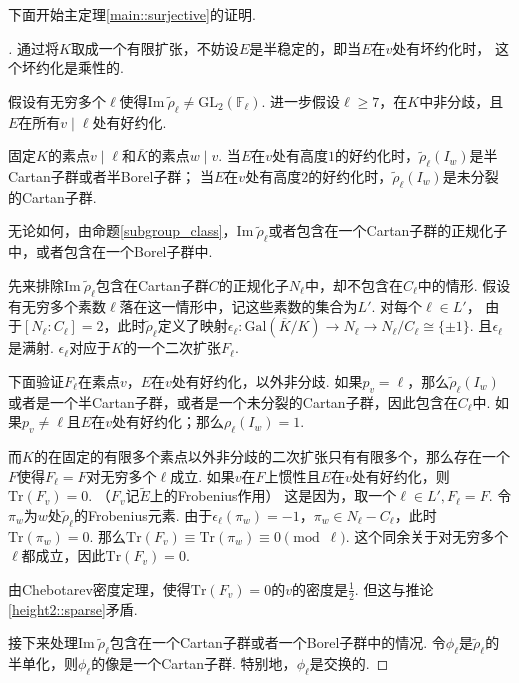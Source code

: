 下面开始主定理\ref{main::surjective}的证明.
\begin{proof}[]
    通过将$K$取成一个有限扩张，不妨设$E$是半稳定的，即当$E$在$v$处有坏约化时，
    这个坏约化是乘性的.

    假设有无穷多个$\ell$使得$\mathrm{Im}\ \tilde{\rho}_{\ell}\neq \mathrm{GL}_2(\mathbb{F}_{\ell})$.
    进一步假设$\ell\geq 7$，在$K$中非分歧，且$E$在所有$v\mid \ell$处有好约化.

    固定$K$的素点$v\mid \ell$和$\overline{K}$的素点$w\mid v$.
    当$E$在$v$处有高度$1$的好约化时，$\tilde{\rho}_{\ell}(I_w)$是半Cartan子群或者半Borel子群；
    当$E$在$v$处有高度$2$的好约化时，$\tilde{\rho}_{\ell}(I_w)$是未分裂的Cartan子群.
    
    无论如何，由命题\ref{subgroup_class}，$\mathrm{Im}\ \tilde{\rho}_{\ell}$或者包含在一个Cartan子群的正规化子中，或者包含在一个Borel子群中.
    \vskip0.3cm

    先来排除$\mathrm{Im}\ \tilde{\rho}_{\ell}$包含在Cartan子群$C$的正规化子$N_{\ell}$中，却不包含在$C_{\ell}$中的情形.
    假设有无穷多个素数$\ell$落在这一情形中，记这些素数的集合为$L'$. 对每个$\ell\in L'$，
    由于$[N_{\ell}:C_{\ell}]=2$，此时$\tilde{\rho}_{\ell}$定义了映射$\epsilon_{\ell}:\mathrm{Gal}(\overline{K}/K) \to N_{\ell}\to N_{\ell}/C_{\ell} \cong \{\pm 1\}$. 且$\epsilon_{\ell}$是满射.
    $\epsilon_{\ell}$对应于$K$的一个二次扩张$F_{\ell}$.

    下面验证$F_{\ell}$在素点$v$，$E$在$v$处有好约化，以外非分歧.
    如果$p_v=\ell$，那么$\tilde{\rho}_{\ell}(I_w)$或者是一个半Cartan子群，或者是一个未分裂的Cartan子群，因此包含在$C_{\ell}$中. 如果$p_v\neq \ell$且$E$在$v$处有好约化；那么$\rho_{\ell}(I_w) = 1$.

    而$K$的在固定的有限多个素点以外非分歧的二次扩张只有有限多个，那么存在一个$F$使得$F_{\ell} =F$对无穷多个$\ell$成立.
    如果$v$在$F$上惯性且$E$在$v$处有好约化，则$\mathrm{Tr}(F_v) = 0$.
    （$F_v$记$\tilde{E}$上的Frobenius作用）
    这是因为，取一个$\ell\in L',F_{\ell}=F$.
    令$\pi_w$为$w$处$\tilde{\rho}_{\ell}$的Frobenius元素.
    由于$\epsilon_{\ell}(\pi_{w})=-1$，$\pi_{w}\in N_{\ell}-C_{\ell}$，此时$\mathrm{Tr}(\pi_w)=0$.
    那么$\mathrm{Tr}(F_v)\equiv \mathrm{Tr}(\pi_{w})\equiv 0\pmod{\ell}$.
    这个同余关于对无穷多个$\ell$都成立，因此$\mathrm{Tr}(F_v) = 0$.

    由Chebotarev密度定理，使得$\mathrm{Tr}(F_v)= 0$的$v$的密度是$\frac{1}{2}$.
    但这与推论\ref{height2::sparse}矛盾.

    \vskip0.3cm

    接下来处理$\mathrm{Im}\ \tilde{\rho}_{\ell}$包含在一个Cartan子群或者一个Borel子群中的情况.
    令$\phi_{\ell}$是$\tilde{\rho}_{\ell}$的半单化，则$\phi_{\ell}$的像是一个Cartan子群.
    特别地，$\phi_{\ell}$是交换的.


\end{proof}

